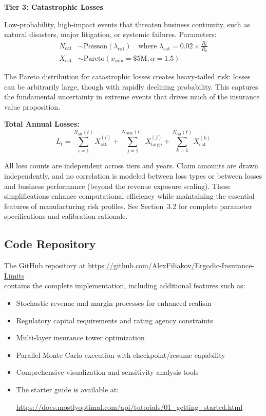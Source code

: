 \documentclass[11pt,letterpaper]{article}
\begin{document}
\vspace{\baselineskip}

\textbf{Tier 3: Catastrophic Losses}

Low-probability, high-impact events that threaten business continuity, such as natural disasters, major litigation, or systemic failures. Parameters:
\begin{align}
N_{\text{cat}} &\sim \text{Poisson}(\lambda_{\text{cat}}) \quad \text{where } \lambda_{\text{cat}} = 0.02 \times \frac{R_t}{R_0} \\
X_{\text{cat}} &\sim \text{Pareto}(x_{\text{min}} = \$5\text{M}, \alpha = 1.5)
\end{align}

The Pareto distribution for catastrophic losses creates heavy-tailed risk: losses can be arbitrarily large, though with rapidly declining probability. This captures the fundamental uncertainty in extreme events that drives much of the insurance value proposition.

\vspace{\baselineskip}

\textbf{Total Annual Losses:}
\begin{equation}
L_t = \sum_{i=1}^{N_{\text{att}}(t)} X_{\text{att}}^{(i)} + \sum_{j=1}^{N_{\text{large}}(t)} X_{\text{large}}^{(j)} + \sum_{k=1}^{N_{\text{cat}}(t)} X_{\text{cat}}^{(k)}
\end{equation}

All loss counts are independent across tiers and years. Claim amounts are drawn independently, and no correlation is modeled between loss types or between losses and business performance (beyond the revenue exposure scaling). These simplifications enhance computational efficiency while maintaining the essential features of manufacturing risk profiles. See Section~3.2 for complete parameter specifications and calibration rationale.

\subsection{Code Repository}\label{sec:code-repo}

The GitHub repository at \url{https://github.com/AlexFiliakov/Ergodic-Insurance-Limits}\\
contains the complete implementation, including additional features such as:
\begin{itemize}
    \item Stochastic revenue and margin processes for enhanced realism
    \item Regulatory capital requirements and rating agency constraints
    \item Multi-layer insurance tower optimization
    \item Parallel Monte Carlo execution with checkpoint/resume capability
    \item Comprehensive visualization and sensitivity analysis tools
    \item The starter guide is available at:

        \url{https://docs.mostlyoptimal.com/api/tutorials/01_getting_started.html}

\end{itemize}
\end{document}
